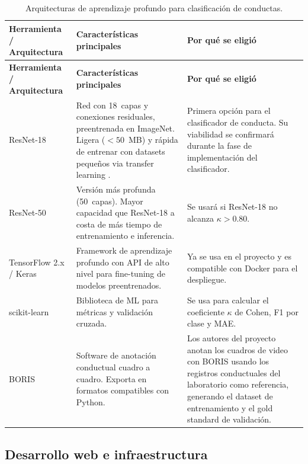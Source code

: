 \begin{longtable}{|p{2.3cm}|p{5.4cm}|p{5.4cm}|}
\caption{Arquitecturas de aprendizaje profundo para clasificación de conductas.
\label{tab:herr_dl}}\\
\hline
\textbf{Herramienta / Arquitectura} & \textbf{Características principales} & \textbf{Por qué se eligió} \\
\hline
\endfirsthead
\hline
\textbf{Herramienta / Arquitectura} & \textbf{Características principales} & \textbf{Por qué se eligió} \\
\hline
\endhead
\hline
\endfoot

ResNet-18 \cite{he2016}
    & Red con 18~capas y conexiones residuales, preentrenada en ImageNet. Ligera
      ($< 50$~MB) y rápida de entrenar con datasets pequeños via transfer learning
      \cite{pan2010}.
    & Primera opción para el clasificador de conducta. Su viabilidad se
      confirmará durante la fase de implementación del clasificador. \\
\hline
ResNet-50 \cite{he2016}
    & Versión más profunda (50~capas). Mayor capacidad que ResNet-18 a costa de más
      tiempo de entrenamiento e inferencia.
    & Se usará si ResNet-18 no alcanza $\kappa > 0.80$. \\
\hline
TensorFlow 2.x / Keras \cite{abadi2016}
    & Framework de aprendizaje profundo con API de alto nivel para fine-tuning de
      modelos preentrenados.
    & Ya se usa en el proyecto y es compatible con Docker para el despliegue. \\
\hline
scikit-learn \cite{pedregosa2011}
    & Biblioteca de ML para métricas y validación cruzada.
    & Se usa para calcular el coeficiente $\kappa$ de Cohen, F1 por clase y MAE. \\
\hline
BORIS \cite{friard2016}
    & Software de anotación conductual cuadro a cuadro. Exporta en formatos
      compatibles con Python.
    & Los autores del proyecto anotan los cuadros de video con BORIS usando los
      registros conductuales del laboratorio como referencia, generando el dataset
      de entrenamiento y el gold standard de validación. \\
\hline

\end{longtable}

\subsection{Desarrollo web e infraestructura}

